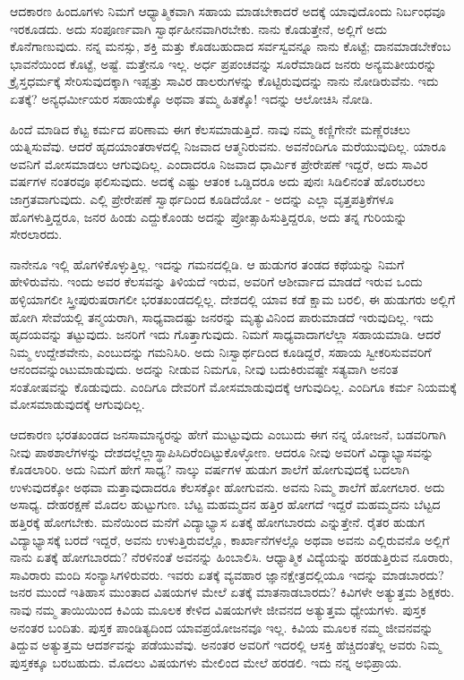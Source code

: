 ಆದಕಾರಣ ಹಿಂದೂಗಳು ನಿಮಗೆ ಆಧ್ಯಾತ್ಮಿಕವಾಗಿ ಸಹಾಯ ಮಾಡಬೇಕಾದರೆ ಅದಕ್ಕೆ ಯಾವುದೊಂದು ನಿರ್ಬಂಧವೂ ಇರಕೂಡದು. ಅದು ಸಂಪೂರ್ಣವಾಗಿ ಸ್ವಾರ್ಥಹೀನವಾಗಿರಬೇಕು. ನಾನು ಕೊಡುತ್ತೇನೆ, ಅಲ್ಲಿಗೆ ಅದು ಕೊನೆಗಾಣುವುದು. ನನ್ನ ಮನಸ್ಸು, ಶಕ್ತಿ ಮತ್ತು ಕೊಡಬಹುದಾದ ಸರ್ವಸ್ವವನ್ನೂ ನಾನು ಕೊಟ್ಟೆ; ದಾನಮಾಡಬೇಕೆಂಬ ಭಾವನೆಯಿಂದ ಕೊಟ್ಟೆ, ಅಷ್ಟೆ. ಮತ್ತೇನೂ ಇಲ್ಲ. ಅರ್ಧ ಪ್ರಪಂಚವನ್ನು ಸೂರೆಮಾಡಿದ ಜನರು ಅನ್ಯಮತೀಯರನ್ನು ಕ್ರೈಸ್ತಧರ್ಮಕ್ಕೆ ಸೇರಿಸುವುದಕ್ಕಾಗಿ ಇಪ್ಪತ್ತು ಸಾವಿರ ಡಾಲರುಗಳನ್ನು ಕೊಟ್ಟಿರುವುದನ್ನು ನಾನು ನೋಡಿರುವೆನು. ಇದು ಏತಕ್ಕೆ? ಅನ್ಯಧರ್ಮೀಯರ ಸಹಾಯಕ್ಕೊ ಅಥವಾ ತಮ್ಮ ಹಿತಕ್ಕೊ! ಇದನ್ನು ಆಲೋಚಿಸಿ ನೋಡಿ.

ಹಿಂದೆ ಮಾಡಿದ ಕೆಟ್ಟ ಕರ್ಮದ ಪರಿಣಾಮ ಈಗ ಕೆಲಸಮಾಡುತ್ತಿದೆ. ನಾವು ನಮ್ಮ ಕಣ್ಣಿಗೇನೇ ಮಣ್ಣೆರಚಲು ಯತ್ನಿಸುವೆವು. ಆದರೆ ಹೃದಯಾಂತರಾಳದಲ್ಲಿ ನಿಜವಾದ ಆತ್ಮನಿರುವನು. ಅವನೆಂದಿಗೂ ಮರೆಯುವುದಿಲ್ಲ. ಯಾರೂ ಅವನಿಗೆ ಮೋಸಮಾಡಲು ಆಗುವುದಿಲ್ಲ. ಎಂದಾದರೂ ನಿಜವಾದ ಧಾರ್ಮಿಕ ಪ್ರೇರೇಪಣೆ ಇದ್ದರೆ, ಅದು ಸಾವಿರ ವರ್ಷಗಳ ನಂತರವೂ ಫಲಿಸುವುದು. ಅದಕ್ಕೆ ಎಷ್ಟು ಆತಂಕ ಒಡ್ಡಿದರೂ ಅದು ಪುನಃ ಸಿಡಿಲಿನಂತೆ ಹೊರಬರಲು ಜಾಗ್ರತವಾಗುವುದು. ಎಲ್ಲಿ ಪ್ರೇರೇಪಣೆ ಸ್ವಾರ್ಥದಿಂದ ಕೂಡಿದೆಯೋ - ಅದನ್ನು ಎಲ್ಲಾ ವೃತ್ತಪತ್ರಿಕೆಗಳೂ ಹೊಗಳುತ್ತಿದ್ದರೂ, ಜನರ ಹಿಂಡು ಎದ್ದುಕೊಂಡು ಅದನ್ನು ಪ್ರೋತ್ಸಾಹಿಸುತ್ತಿದ್ದರೂ, ಅದು ತನ್ನ ಗುರಿಯನ್ನು ಸೇರಲಾರದು.

ನಾನೇನೂ ಇಲ್ಲಿ ಹೊಗಳಿಕೊಳ್ಳುತ್ತಿಲ್ಲ. ಇದನ್ನು ಗಮನದಲ್ಲಿಡಿ. ಆ ಹುಡುಗರ ತಂಡದ ಕಥೆಯನ್ನು ನಿಮಗೆ ಹೇಳಿರುವೆನು. ಇಂದು ಅವರ ಕೆಲಸವನ್ನು ತಿಳಿಯದೆ ಇರುವ, ಅವರಿಗೆ ಆಶೀರ್ವಾದ ಮಾಡದೆ ಇರುವ ಒಂದು ಹಳ್ಳಿಯಾಗಲೀ ಸ್ತ್ರೀಪುರುಷರಾಗಲೀ ಭರತಖಂಡದಲ್ಲಿಲ್ಲ. ದೇಶದಲ್ಲಿ ಯಾವ ಕಡೆ ಕ್ಷಾಮ ಬರಲಿ, ಈ ಹುಡುಗರು ಅಲ್ಲಿಗೆ ಹೋಗಿ ಸೇವೆಯಲ್ಲಿ ತನ್ಮಯರಾಗಿ, ಸಾಧ್ಯವಾದಷ್ಟು ಜನರನ್ನು ಮೃತ್ಯುವಿನಿಂದ ಪಾರುಮಾಡದೆ ಇರುವುದಿಲ್ಲ. ಇದು ಹೃದಯವನ್ನು ತಟ್ಟುವುದು. ಜನರಿಗೆ ಇದು ಗೊತ್ತಾಗುವುದು. ನಿಮಗೆ ಸಾಧ್ಯವಾದಾಗಲೆಲ್ಲಾ ಸಹಾಯಮಾಡಿ. ಆದರೆ ನಿಮ್ಮ ಉದ್ದೇಶವೇನು, ಎಂಬುದನ್ನು ಗಮನಿಸಿರಿ. ಅದು ನಿಃಸ್ವಾರ್ಥದಿಂದ ಕೂಡಿದ್ದರೆ, ಸಹಾಯ ಸ್ವೀಕರಿಸುವವರಿಗೆ ಆನಂದವನ್ನುಂಟುಮಾಡುವುದು. ಅದನ್ನು ನೀಡುವ ನಿಮಗೂ, ನೀವು ಬದುಕಿರುವಷ್ಟೇ ಸತ್ಯವಾಗಿ ಅನಂತ ಸಂತೋಷವನ್ನು ಕೊಡುವುದು. ಎಂದಿಗೂ ದೇವರಿಗೆ ಮೋಸಮಾಡುವುದಕ್ಕೆ ಆಗುವುದಿಲ್ಲ. ಎಂದಿಗೂ ಕರ್ಮ ನಿಯಮಕ್ಕೆ ಮೋಸಮಾಡುವುದಕ್ಕೆ ಆಗುವುದಿಲ್ಲ.

ಆದಕಾರಣ ಭರತಖಂಡದ ಜನಸಾಮಾನ್ಯರನ್ನು ಹೇಗೆ ಮುಟ್ಟುವುದು ಎಂಬುದು ಈಗ ನನ್ನ ಯೋಜನೆ, ಬಡವರಿಗಾಗಿ ನೀವು ಪಾಠಶಾಲೆಗಳನ್ನು ದೇಶದಲ್ಲೆಲ್ಲಾ\break ಸ್ಥಾಪಿಸಿದಿರೆಂದಿಟ್ಟುಕೊಳ್ಳೋಣ. ಆದರೂ ನೀವು ಅವರಿಗೆ ವಿದ್ಯಾಭ್ಯಾಸವನ್ನು ಕೊಡಲಾರಿರಿ. ಅದು ನಿಮಗೆ ಹೇಗೆ ಸಾಧ್ಯ? ನಾಲ್ಕು ವರ್ಷಗಳ ಹುಡುಗ ಶಾಲೆಗೆ ಹೋಗುವುದಕ್ಕೆ ಬದಲಾಗಿ ಉಳುವುದಕ್ಕೋ ಅಥವಾ ಮತ್ತಾವುದಾದರೂ ಕೆಲಸಕ್ಕೋ ಹೋಗುವನು. ಅವನು ನಿಮ್ಮ ಶಾಲೆಗೆ ಹೋಗಲಾರ. ಅದು ಅಸಾಧ್ಯ. ದೇಹರಕ್ಷಣೆ ಮೊದಲ ಹುಟ್ಟುಗುಣ. ಬೆಟ್ಟ ಮಹಮ್ಮದನ ಹತ್ತಿರ ಹೋಗದೆ ಇದ್ದರೆ ಮಹಮ್ಮದನು ಬೆಟ್ಟದ ಹತ್ತಿರಕ್ಕೆ ಹೋಗಬೇಕು. ಮನೆಯಿಂದ ಮನೆಗೆ ವಿದ್ಯಾಭ್ಯಾಸ ಏತಕ್ಕೆ ಹೋಗಬಾರದು ಎನ್ನುತ್ತೇನೆ. ರೈತರ ಹುಡುಗ ವಿದ್ಯಾಭ್ಯಾಸಕ್ಕೆ ಬರದೆ ಇದ್ದರೆ, ಅವನು ಉಳುತ್ತಿರುವಲ್ಲೊ, ಕಾರ್ಖಾನೆಗಳಲ್ಲೊ ಅಥವಾ ಅವನು ಎಲ್ಲಿರುವನೊ ಅಲ್ಲಿಗೆ ನಾನು ಏತಕ್ಕೆ ಹೋಗಬಾರದು? ನೆರಳಿನಂತೆ ಅವನನ್ನು ಹಿಂಬಾಲಿಸಿ. ಆಧ್ಯಾತ್ಮಿಕ ವಿದ್ಯೆಯನ್ನು ಹರಡುತ್ತಿರುವ ನೂರಾರು, ಸಾವಿರಾರು ಮಂದಿ ಸಂನ್ಯಾಸಿಗಳಿರುವರು. ಇವರು ಏತಕ್ಕೆ ವ್ಯವಹಾರ ಜ್ಞಾನಕ್ಷೇತ್ರದಲ್ಲಿಯೂ ಇದನ್ನು ಮಾಡಬಾರದು? ಜನರ ಮುಂದೆ ಇತಿಹಾಸ ಮುಂತಾದ ವಿಷಯಗಳ ಮೇಲೆ ಏತಕ್ಕೆ ಮಾತನಾಡಬಾರದು? ಕಿವಿಗಳೇ ಅತ್ಯುತ್ತಮ ಶಿಕ್ಷಕರು. ನಾವು ನಮ್ಮ ತಾಯಿಯಿಂದ ಕಿವಿಯ ಮೂಲಕ ಕೇಳಿದ ವಿಷಯಗಳೇ ಜೀವನದ ಅತ್ಯುತ್ತಮ ಧ್ಯೇಯಗಳು. ಪುಸ್ತಕ ಅನಂತರ ಬಂದಿತು. ಪುಸ್ತಕ ಪಾಂಡಿತ್ಯದಿಂದ ಯಾವ\break ಪ್ರಯೋಜನವೂ ಇಲ್ಲ. ಕಿವಿಯ ಮೂಲಕ ನಮ್ಮ ಜೀವನವನ್ನು ತಿದ್ದುವ ಅತ್ಯುತ್ತಮ ಆದರ್ಶವನ್ನು ಪಡೆಯುವೆವು. ಅನಂತರ ಅವರಿಗೆ ಇದರಲ್ಲಿ ಆಸಕ್ತಿ ಹೆಚ್ಚಿದಂತೆಲ್ಲ ಅವರು ನಿಮ್ಮ ಪುಸ್ತಕಕ್ಕೂ ಬರಬಹುದು. ಮೊದಲು ವಿಷಯಗಳು ಮೇಲಿಂದ ಮೇಲೆ ಹರಡಲಿ. ಇದು ನನ್ನ ಅಭಿಪ್ರಾಯ.

